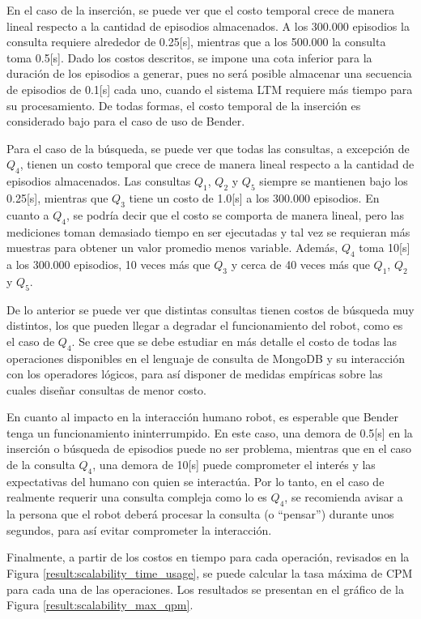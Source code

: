 En el caso de la inserción, se puede ver que el costo temporal crece de manera lineal respecto a la cantidad de episodios almacenados. A los 300.000 episodios la consulta requiere alrededor de 0.25[s], mientras que a los 500.000 la consulta toma 0.5[s]. Dado los costos descritos, se impone una cota inferior para la duración de los episodios a generar, pues no será posible almacenar una secuencia de episodios de 0.1[s] cada uno, cuando el sistema LTM requiere más tiempo para su procesamiento. De todas formas, el costo temporal de la inserción es considerado bajo para el caso de uso de Bender.

Para el caso de la búsqueda, se puede ver que todas las consultas, a excepción de $Q_4$, tienen un costo temporal que crece de manera lineal  respecto a la cantidad de episodios almacenados. Las consultas $Q_1$, $Q_2$ y $Q_5$ siempre se mantienen bajo los 0.25[s], mientras que $Q_3$ tiene un costo de 1.0[s] a los 300.000 episodios. En cuanto a $Q_4$, se podría decir que el costo se comporta de manera lineal, pero las mediciones toman demasiado tiempo en ser ejecutadas y tal vez se requieran más muestras para obtener un valor promedio menos variable. Además, $Q_4$ toma 10[s] a los 300.000 episodios, 10 veces más que $Q_3$ y cerca de 40 veces más que $Q_1$, $Q_2$ y $Q_5$.

De lo anterior se puede ver que distintas consultas tienen costos de búsqueda muy  distintos, los que pueden llegar a degradar el funcionamiento del robot, como es el caso de $Q_4$.  Se cree que se debe estudiar en más detalle el costo de todas las operaciones disponibles en el lenguaje de consulta de MongoDB y su interacción con los operadores lógicos, para así disponer de medidas empíricas sobre las cuales diseñar consultas de menor costo.

En cuanto al impacto en la interacción humano robot, es esperable que Bender tenga un funcionamiento ininterrumpido. En este caso, una demora de 0.5[s] en la inserción o búsqueda de episodios puede no ser problema, mientras que en el caso de la consulta $Q_4$, una demora de 10[s] puede comprometer el interés y las expectativas del humano con quien se interactúa. Por lo tanto, en el caso de realmente requerir una consulta compleja como lo es $Q_4$, se recomienda avisar a la persona que el robot deberá procesar la consulta (o ``pensar'') durante unos segundos, para así evitar comprometer la interacción.


 Finalmente, a partir de los costos en tiempo para cada operación, revisados en la Figura \ref{result:scalability_time_usage}, se puede calcular la tasa máxima de CPM para cada una de las operaciones. Los resultados se presentan en el gráfico de la Figura \ref{result:scalability_max_qpm}. 

